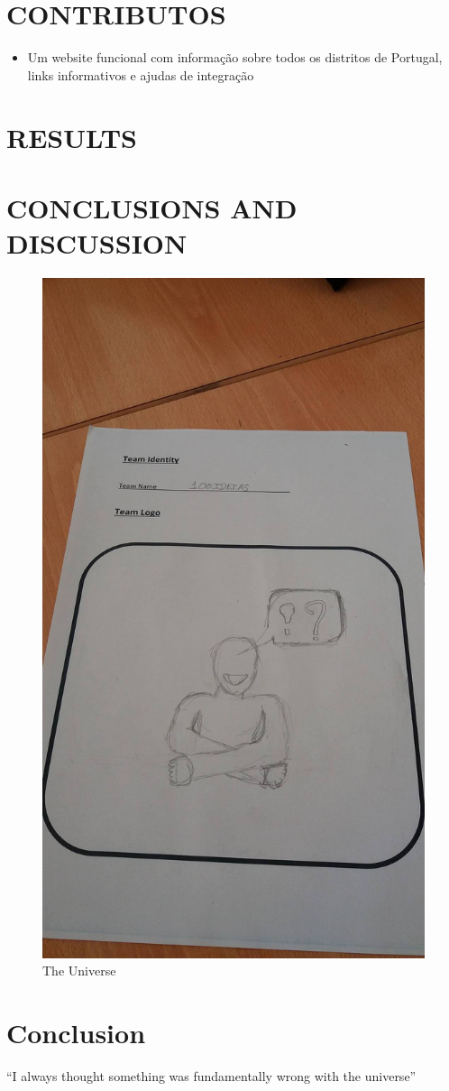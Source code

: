 \documentclass{article}
\begin{document}
\section{CONTRIBUTOS}
\begin{itemize}
\item Um website funcional com informação sobre todos os distritos
de Portugal, links informativos e ajudas de integração
\end{itemize}
\section{RESULTS}
 
\section{CONCLUSIONS AND DISCUSSION}




\begin{figure}[h!]
\centering
\includegraphics[scale=1.7]{logo.jpg}
\caption{The Universe}
\label{fig:univerise}
\end{figure}

\section{Conclusion}
``I always thought something was fundamentally wrong with the universe'' \citep{adams1995hitchhiker}



\end{document}
